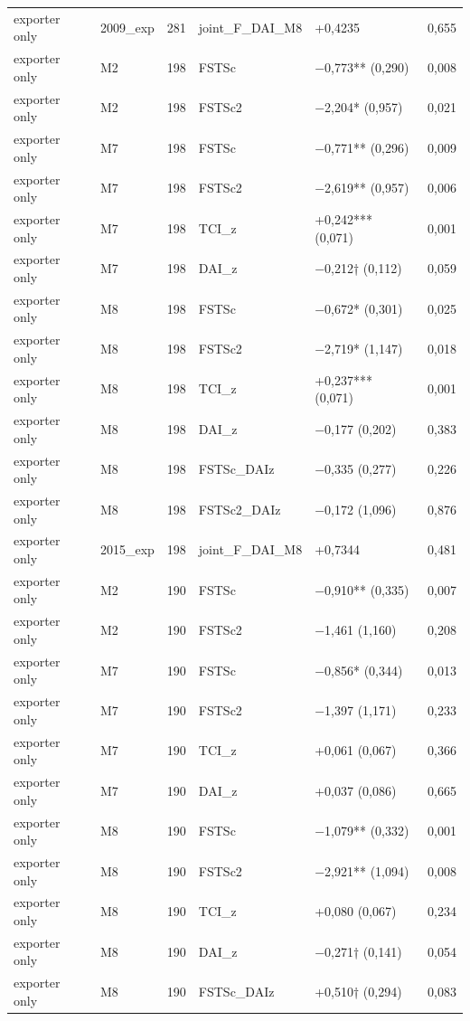 \documentclass[12pt,a4paper]{article}
\begin{document}
\begin{longtable}[]{@{}llllll@{}}
exporter only & 2009\_exp & 281 & joint\_F\_DAI\_M8 & +0,4235 & 0,655 \\
exporter only & M2 & 198 & FSTSc & −0,773** (0,290) & 0,008 \\
exporter only & M2 & 198 & FSTSc2 & −2,204* (0,957) & 0,021 \\
exporter only & M7 & 198 & FSTSc & −0,771** (0,296) & 0,009 \\
exporter only & M7 & 198 & FSTSc2 & −2,619** (0,957) & 0,006 \\
exporter only & M7 & 198 & TCI\_z & +0,242*** (0,071) & 0,001 \\
exporter only & M7 & 198 & DAI\_z & −0,212† (0,112) & 0,059 \\
exporter only & M8 & 198 & FSTSc & −0,672* (0,301) & 0,025 \\
exporter only & M8 & 198 & FSTSc2 & −2,719* (1,147) & 0,018 \\
exporter only & M8 & 198 & TCI\_z & +0,237*** (0,071) & 0,001 \\
exporter only & M8 & 198 & DAI\_z & −0,177 (0,202) & 0,383 \\
exporter only & M8 & 198 & FSTSc\_DAIz & −0,335 (0,277) & 0,226 \\
exporter only & M8 & 198 & FSTSc2\_DAIz & −0,172 (1,096) & 0,876 \\
exporter only & 2015\_exp & 198 & joint\_F\_DAI\_M8 & +0,7344 & 0,481 \\
exporter only & M2 & 190 & FSTSc & −0,910** (0,335) & 0,007 \\
exporter only & M2 & 190 & FSTSc2 & −1,461 (1,160) & 0,208 \\
exporter only & M7 & 190 & FSTSc & −0,856* (0,344) & 0,013 \\
exporter only & M7 & 190 & FSTSc2 & −1,397 (1,171) & 0,233 \\
exporter only & M7 & 190 & TCI\_z & +0,061 (0,067) & 0,366 \\
exporter only & M7 & 190 & DAI\_z & +0,037 (0,086) & 0,665 \\
exporter only & M8 & 190 & FSTSc & −1,079** (0,332) & 0,001 \\
exporter only & M8 & 190 & FSTSc2 & −2,921** (1,094) & 0,008 \\
exporter only & M8 & 190 & TCI\_z & +0,080 (0,067) & 0,234 \\
exporter only & M8 & 190 & DAI\_z & −0,271† (0,141) & 0,054 \\
exporter only & M8 & 190 & FSTSc\_DAIz & +0,510† (0,294) & 0,083 \\

\end{longtable}
\end{document}
